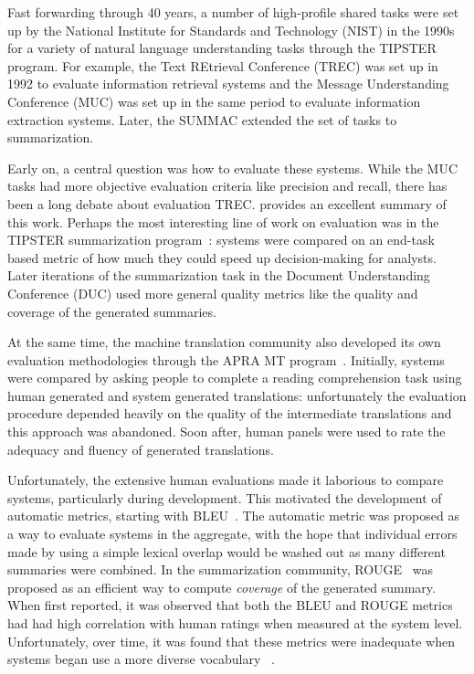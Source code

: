 Fast forwarding through 40 years, a number of high-profile shared tasks were set up by the National Institute for Standards and Technology (NIST) in the 1990s for a variety of natural language understanding tasks through the TIPSTER program.
For example, the Text REtrieval Conference (TREC) was set up in 1992 to evaluate information retrieval systems and the Message Understanding Conference (MUC) was set up in the same period to evaluate information extraction systems.
Later, the SUMMAC extended the set of tasks to summarization.

Early on, a central question was how to evaluate these systems.
While the MUC tasks had more objective evaluation criteria like precision and recall, there has been a long debate about evaluation TREC.\@
\citet{webber2010measurement} provides an excellent summary of this work.
Perhaps the most interesting line of work on evaluation was in the TIPSTER summarization program~\citep{mani1999tipster}:
  systems were compared on an end-task based metric of how much they could speed up decision-making for analysts.
Later iterations of the summarization task in the Document Understanding Conference (DUC) used more general quality metrics like the quality and coverage of the generated summaries.

At the same time, the machine translation community also developed its own evaluation methodologies through the APRA MT program~\cite{white1994arpa}.
Initially, systems were compared by asking people to complete a reading comprehension task using human generated and system generated translations: unfortunately the evaluation procedure depended heavily on the quality of the intermediate translations  and this approach was abandoned.
Soon after, human panels were used to rate the adequacy and fluency of generated translations.

Unfortunately, the extensive human evaluations made it laborious to compare systems, particularly during development.
This motivated the development of automatic metrics, starting with BLEU~\citep{papineni02bleu}.
The automatic metric was proposed as a way to evaluate systems in the aggregate, with the hope that individual errors made by using a simple lexical overlap would be washed out as many different summaries were combined.
In the summarization community, ROUGE~\citep{lin2004rouge} was proposed as an efficient way to compute \textit{coverage} of the generated summary.
When first reported, it was observed that both the BLEU and ROUGE metrics had had high correlation with human ratings when measured at the system level.
Unfortunately, over time, it was found that these metrics were inadequate when systems began use a more diverse vocabulary~\cite{lavie2009meteor,cohan2016revisiting} .

